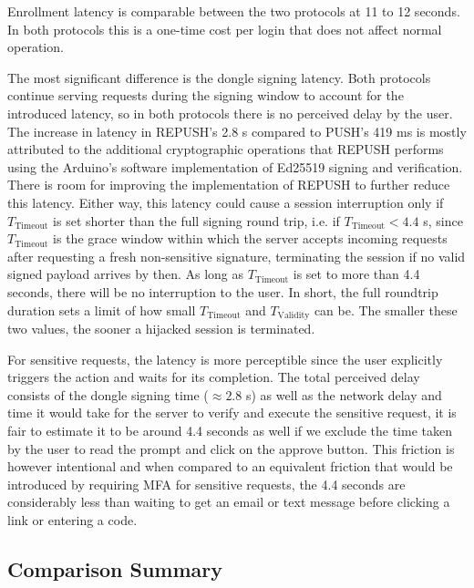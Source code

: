 Enrollment latency is comparable between the two protocols at 11 to 12 seconds. In both protocols this is a one-time cost per login that does not affect normal operation.

The most significant difference is the dongle signing latency. Both protocols continue serving requests during the signing window to account for the introduced latency, so in both protocols there is no perceived delay by the user. The increase in latency in REPUSH's 2.8 s compared to PUSH's 419 ms is mostly attributed to the additional cryptographic operations that REPUSH performs using the Arduino's software implementation of Ed25519 signing and verification. There is room for improving the implementation of REPUSH to further reduce this latency. Either way, this latency could cause a session interruption only if $T_\text{Timeout}$ is set shorter than the full signing round trip, i.e. if $T_\text{Timeout} < 4.4$ s, since $T_\text{Timeout}$ is the grace window within which the server accepts incoming requests after requesting a fresh non-sensitive signature, terminating the session if no valid signed payload arrives by then. As long as $T_\text{Timeout}$ is set to more than 4.4 seconds, there will be no interruption to the user. In short, the full roundtrip duration sets a limit of how small $T_\text{Timeout}$ and $T_\text{Validity}$ can be. The smaller these two values, the sooner a hijacked session is terminated.

For sensitive requests, the latency is more perceptible since the user explicitly triggers the action and waits for its completion. The total perceived delay consists of the dongle signing time ($\approx 2.8$ s) as well as the network delay and time it would take for the server to verify and execute the sensitive request, it is fair to estimate it to be around 4.4 seconds as well if we exclude the time taken by the user to read the prompt and click on the approve button. This friction is however intentional and when compared to an equivalent friction that would be introduced by requiring MFA for sensitive requests, the 4.4 seconds are considerably less than waiting to get an email or text message before clicking a link or entering a code.

\subsection{Comparison Summary}

